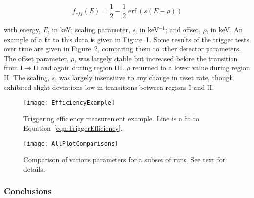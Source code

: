 				\begin{equation}
					f_{eff}(E) = \frac{1}{2} - \frac{1}{2} \operatorname{erf} \left( s ( E-\rho ) \right)
					\label{eqn:TriggerEfficiency}
				\end{equation}
				
with energy, $E$, in keV; scaling parameter, $s$, in keV$^{-1}$; and offset, $\rho$, in keV.  An example of a fit to this data is given in Figure~\ref{fig:PPC2TriggeringEfficiencyExample}.  Some results of the trigger tests over time are given in Figure~\ref{fig:PPC2AllPlotCompare}, comparing them to other detector parameters.  The offset parameter, $\rho$, was largely stable but increased before the transition from I$\to$II and again during region III.  $\rho$ returned to a lower value during region II.  The scaling, $s$, was largely insensitive to any change in reset rate, though exhibited slight deviations low in transitions between regions I and II.  

				\begin{figure}
					\centering
					\texttt{[image: EfficiencyExample]}
					\caption{Triggering efficiency measurement example.  Line is a fit to 
					Equation~\ref{eqn:TriggerEfficiency}.}
					\label{fig:PPC2TriggeringEfficiencyExample}
				\end{figure}
	

			
				\begin{figure}
					\centering
					\texttt{[image: AllPlotComparisons]}
					\caption{Comparison of various parameters for a subset of runs.  See text for details.}
					\label{fig:PPC2AllPlotCompare}
				\end{figure}
	
	    	\subsubsection{Conclusions}
		\label{sec:DeploymentPPC2SoudanAnalysisParsTimeConclusion}    	
	
